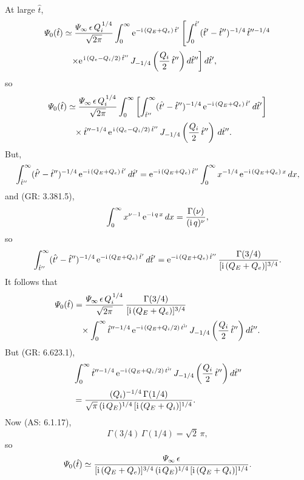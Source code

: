 \documentclass[titlepage=false,12pt]{article}
\begin{document}
At large $\hat{t}$, 
\begin{align}
{\mit\Psi}_0(\hat{t}) &\simeq \frac{{\mit\Psi}_\infty\,\epsilon\,Q_i^{\,1/4}}{\sqrt{2\pi}}\int_0^{\infty}{\rm e}^{-{\rm i}\,(Q_E+Q_e)\,\hat{t}'}
\left[\int_0^{\hat{t}'}(\hat{t}'-\hat{t}'')^{-1/4}\,\hat{t}''^{-1/4}\right.\nonumber\\[0.5ex]
&\phantom{=}\left.\times{\rm e}^{\,{\rm i}\,(Q_e-Q_i/2)\,\hat{t}''}\,J_{-1/4}\left(\frac{Q_i}{2}\,\hat{t}''\right)d\hat{t}''\right]d\hat{t}',
\end{align}
so
\begin{align}
{\mit\Psi}_0(\hat{t}) &\simeq \frac{{\mit\Psi}_\infty\,\epsilon\,Q_i^{\,1/4}}{\sqrt{2\pi}}
\int_0^\infty\left[\int_{\hat{t}''}^\infty(\hat{t'}-\hat{t}'')^{-1/4}\,{\rm e}^{-{\rm i}\,(Q_E+Q_e)\,\hat{t}'}\,d\hat{t}'\right]\nonumber\\[0.5ex]
&\phantom{=}\times \hat{t}''^{-1/4}\,{\rm e}^{\,{\rm i}\,(Q_e-Q_i/2)\,\hat{t}''}\,J_{-1/4}\left(\frac{Q_i}{2}\,\hat{t}''\right)\,d\hat{t}''.
\end{align}
But,
\begin{align}
\int_{\hat{t}''}^\infty(\hat{t'}-\hat{t}'')^{-1/4}\,{\rm e}^{-{\rm i}\,(Q_E+Q_e)\,\hat{t}'}\,d\hat{t}'={\rm e}^{-{\rm i}\,(Q_E+Q_e)\,\hat{t}''} \int_0^\infty
x^{-1/4}\,{\rm e}^{-{\rm i}\,(Q_E+Q_e)\,x}\,dx,
\end{align}
and (GR: 3.381.5), 
\begin{equation}
\int_0^\infty x^{\nu-1}\,{\rm e}^{-{\rm i}\,q\,x}\,dx = \frac{\Gamma(\nu)}{({\rm i}\,q)^{\nu}},
\end{equation}
so 
\begin{equation}
\int_{\hat{t}''}^\infty (\hat{t'}-\hat{t}'')^{-1/4}\,{\rm e}^{-{\rm i}\,(Q_E+Q_e)\,\hat{t}'}\,d\hat{t}'={\rm e}^{-{\rm i}\,(Q_E+Q_e)\,\hat{t}''} \, \frac{\Gamma(3/4)}{[{\rm i}\,(Q_E+Q_e)]^{3/4}}.
\end{equation}
It follows that
\begin{align}
{\mit\Psi}_0(\hat{t})&= \frac{{\mit\Psi}_\infty\,\epsilon\,Q_i^{\,1/4}}{\sqrt{2\pi}}\,\frac{\Gamma(3/4)}{[{\rm i}\,(Q_E+Q_e)]^{3/4}}\nonumber\\[0.5ex]&\phantom{=}\times
\int_0^\infty \hat{t}''^{-1/4}\,{\rm e}^{-{\rm i}\,(Q_E+Q_i/2)\,\hat{t''}}\,J_{-1/4}\left(\frac{Q_i}{2}\,\hat{t}''\right)d\hat{t}''.
\end{align}
But (GR: 6.623.1), 
\begin{align}
&\int_0^\infty \hat{t}''^{-1/4}\,{\rm e}^{-{\rm i}\,(Q_E+Q_i/2)\,\hat{t''}}\,J_{-1/4}\left(\frac{Q_i}{2}\,\hat{t}''\right)d\hat{t}'' \nonumber\\[0.5ex]
&= \frac{(Q_i)^{-1/4}\,\Gamma(1/4)}{\sqrt{\pi}\,({\rm i}\,Q_E)^{1/4}\,[{\rm i}\,(Q_E+Q_i)]^{1/4}}.
\end{align}
Now (AS: 6.1.17),
\begin{equation}
\Gamma(3/4)\,\Gamma(1/4)= \sqrt{2}\,\pi,
\end{equation}
so
\begin{equation}
{\mit\Psi}_0(\hat{t})\simeq 
\frac{{\mit\Psi}_\infty\,\epsilon}{[{\rm i}\,(Q_E+Q_e)]^{3/4}\,({\rm i}\,Q_E)^{1/4}\,[{\rm i}\,(Q_E+Q_i)]^{1/4}}.
\end{equation}
\end{document}
